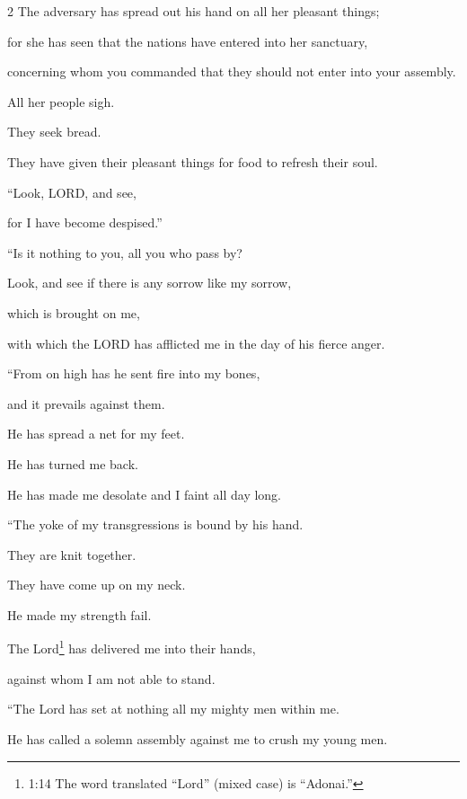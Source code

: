 \begin{multicols}{2}
	\myverse{}The adversary has spread out his hand on all her pleasant things;
	
	for she has seen that the nations have entered into her sanctuary,
	
	concerning whom you commanded that they should not enter into your assembly.
	\vspace{\baselineskip}
	
	\myverse{}All her people sigh.
	
	They seek bread.
	
	They have given their pleasant things for food to refresh their soul.
	
	“Look, LORD, and see,
	
	for I have become despised.”
	\vspace{\baselineskip}
	
	\myverse{}“Is it nothing to you, all you who pass by?
	
	Look, and see if there is any sorrow like my sorrow,
	
	which is brought on me,
	
	with which the LORD has afflicted me in the day of his fierce anger.
	\vspace{\baselineskip}
	
	\myverse{}“From on high has he sent fire into my bones,
	
	and it prevails against them.
	
	He has spread a net for my feet.
	
	He has turned me back.
	
	He has made me desolate and I faint all day long.
	\vspace{\baselineskip}
	
	\myverse{}“The yoke of my transgressions is bound by his hand.
	
	They are knit together.
	
	They have come up on my neck.
	
	He made my strength fail.
	
	The Lord\footnote{1:14 The word translated “Lord” (mixed case) is “Adonai.”} has delivered me into their hands,
	
	against whom I am not able to stand.
	\vspace{\baselineskip}
	
	\myverse{}“The Lord has set at nothing all my mighty men within me.
	
	He has called a solemn assembly against me to crush my young men.
	

\end{multicols}
